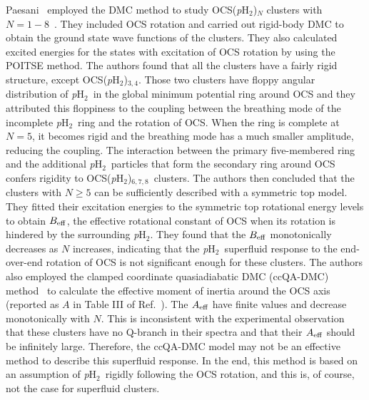 \documentclass[12pt]{iopart}
\newcommand{\phtwo}{{\em p}H$_2$}
\begin{document}
Paesani \etal~employed the DMC method to study OCS(\phtwo)$_N$ clusters with $N=1-8$~\cite{paesani_ocs_ph2_1-8}. 
They included OCS rotation and carried out rigid-body DMC to obtain the ground state wave functions of the clusters. 
They also calculated excited energies for the states with excitation of OCS rotation by using the POITSE method. 
The authors found that all the clusters have a fairly rigid structure, except OCS(\phtwo)$_{3,4}$. 
Those two clusters have floppy angular distribution of \phtwo~in the global minimum potential ring around OCS and they attributed this floppiness to the coupling between the breathing mode of the incomplete \phtwo~ring and the rotation of OCS. 
When the ring is complete at $N=5$, it becomes rigid and the breathing mode has a much smaller amplitude, 
reducing the coupling. 
The interaction between the primary five-membered ring and the additional \phtwo~particles that form the secondary ring around OCS confers rigidity to OCS(\phtwo)$_{6,7,8}$~clusters. 
The authors then concluded that the clusters with $N\ge 5$ can be sufficiently described with a symmetric top model. 
They fitted their excitation energies to the symmetric top rotational energy levels to obtain $B_{\rm eff}$, 
the effective rotational constant of OCS when its rotation is hindered by the surrounding \phtwo. 
They found that the $B_{\rm eff}$ monotonically decreases as $N$ increases, 
indicating that the \phtwo~superfluid response to the end-over-end rotation of OCS is not significant enough for these clusters. 
The authors also employed the clamped coordinate quasiadiabatic DMC (ccQA-DMC) method~\cite{quack_ccqa} to calculate the effective moment of inertia around the OCS axis (reported as $A$ in Table III of Ref.~\cite{paesani_ocs_ph2_1-8}). 
The $A_{\rm eff}$ have finite values and decrease monotonically with $N$. 
This is inconsistent with the experimental observation~\cite{tang_h2_ocs_2nd} 
that these clusters have no Q-branch in their spectra and that their $A_{\rm eff}$ should be infinitely large. 
Therefore, the ccQA-DMC model may not be an effective method to describe this superfluid response. 
In the end, this method is based on an assumption of \phtwo~rigidly following the OCS rotation, and this is, of course, not the case for superfluid clusters.
\end{document}
